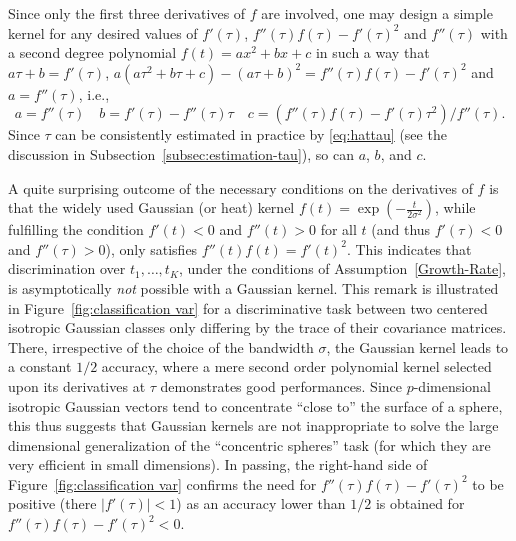 \documentclass[twoside,11pt]{article}
\begin{document}
Since only the first three derivatives of $f$ are involved, one may design a simple kernel for any desired values of $f'(\tau)$, $f''(\tau)f(\tau)-f'(\tau)^2$ and $f''(\tau)$ with a second degree polynomial $f(t)=ax^2+bx+c$ in such a way that $a\tau+b=f'(\tau)$, $a(a\tau^2+b\tau+c)-(a\tau+b)^2=f''(\tau)f(\tau)-f'(\tau)^2$ and $a=f''(\tau)$, i.e.,
\begin{equation}
	a=f''(\tau)\quad b=f'(\tau)-f''(\tau)\tau\quad c=(f''(\tau)f(\tau)-f'(\tau)\tau^2)/f''(\tau)\nonumber.
\end{equation}
Since $\tau$ can be consistently estimated in practice by \eqref{eq:hattau} (see the discussion in Subsection~\ref{subsec:estimation-tau}), so can $a$, $b$, and $c$.

\medskip


A quite surprising outcome of the necessary conditions on the derivatives of $f$ is that the widely used Gaussian (or heat) kernel $f(t)=\exp(-\frac{t}{2\sigma^2})$, while fulfilling the condition $f'(t)<0$ and $f''(t)>0$ for all $t$ (and thus $f'(\tau)<0$ and $f''(\tau)>0$), only satisfies $f''(t)f(t)=f'(t)^2$. This indicates that discrimination over $t_1,\ldots,t_K$, under the conditions of Assumption~\ref{Growth-Rate}, is asymptotically \textit{not} possible with a Gaussian kernel.
This remark is illustrated in Figure~\ref{fig:classification var} for a discriminative task between two centered isotropic Gaussian classes only differing by the trace of their covariance matrices. There, irrespective of the choice of the bandwidth $\sigma$, the Gaussian kernel leads to a constant $1/2$ accuracy, where a mere second order polynomial kernel selected upon its derivatives at $\tau$ demonstrates good performances. Since $p$-dimensional isotropic Gaussian vectors tend to concentrate ``close to'' the surface of a sphere, this thus suggests that Gaussian kernels are not inappropriate to solve the large dimensional generalization of the ``concentric spheres'' task (for which they are very efficient in small dimensions).
In passing, the right-hand side of Figure~\ref{fig:classification var} confirms the need for $f''(\tau)f(\tau)-f'(\tau)^2$ to be positive (there $|f'(\tau)|<1$) as an accuracy lower than $1/2$ is obtained for $f''(\tau)f(\tau)-f'(\tau)^2<0$. 
\end{document}
